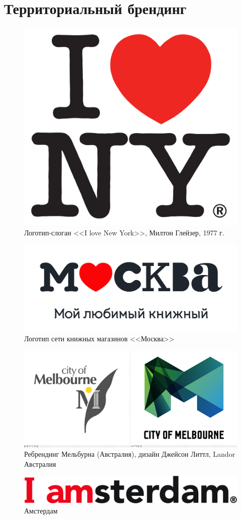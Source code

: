 \section{Территориальный брендинг}
\label{app:territorial}

\begin{figure}[ht]
  \centering
  \includegraphics[width=.3\linewidth]{images/supplement/territorial/ny}
  \caption[]{Логотип-слоган <<I love New York>>, Милтон Глейзер, 1977 г.}
  \label{fig:territorial:ny}
\end{figure}

\begin{figure}[ht]
  \centering
  \includegraphics[width=.5\linewidth]{images/supplement/territorial/moscow}
  \caption[]{Логотип сети книжных магазинов <<Москва>>}
  \label{fig:territorial:moscow}
\end{figure}

\begin{figure}[ht]
  \centering
  \includegraphics[width=.5\linewidth]{images/supplement/territorial/melbourne}
  \caption[]{Ребрендинг Мельбурна (Австралия), дизайн Джейсон Литтл, Landor Австралия}
  \label{fig:territorial:melbourne}
\end{figure}

\begin{figure}[ht]
  \centering
  \includegraphics[width=.5\linewidth]{images/supplement/territorial/amsterdam}
  \caption[]{Амстердам}
  \label{fig:territorial:amsterdam}
\end{figure}

